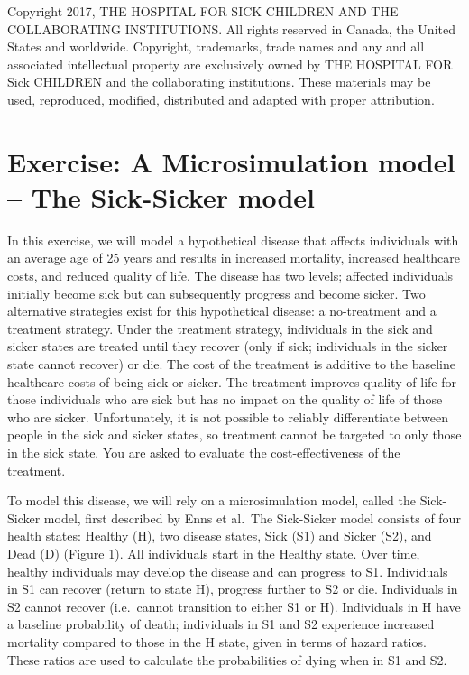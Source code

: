 \documentclass[
]{article}
\begin{document}
Copyright 2017, THE HOSPITAL FOR SICK CHILDREN AND THE COLLABORATING
INSTITUTIONS. All rights reserved in Canada, the United States and
worldwide. Copyright, trademarks, trade names and any and all associated
intellectual property are exclusively owned by THE HOSPITAL FOR Sick
CHILDREN and the collaborating institutions. These materials may be
used, reproduced, modified, distributed and adapted with proper
attribution.

\hypertarget{exercise-a-microsimulation-model-the-sick-sicker-model}{%
\section{Exercise: A Microsimulation model -- The Sick-Sicker
model}\label{exercise-a-microsimulation-model-the-sick-sicker-model}}

In this exercise, we will model a hypothetical disease that affects
individuals with an average age of 25 years and results in increased
mortality, increased healthcare costs, and reduced quality of life. The
disease has two levels; affected individuals initially become sick but
can subsequently progress and become sicker. Two alternative strategies
exist for this hypothetical disease: a no-treatment and a treatment
strategy. Under the treatment strategy, individuals in the sick and
sicker states are treated until they recover (only if sick; individuals
in the sicker state cannot recover) or die. The cost of the treatment is
additive to the baseline healthcare costs of being sick or sicker. The
treatment improves quality of life for those individuals who are sick
but has no impact on the quality of life of those who are sicker.
Unfortunately, it is not possible to reliably differentiate between
people in the sick and sicker states, so treatment cannot be targeted to
only those in the sick state. You are asked to evaluate the
cost-effectiveness of the treatment.

To model this disease, we will rely on a microsimulation model, called
the Sick-Sicker model, first described by Enns et al.~The Sick-Sicker
model consists of four health states: Healthy (H), two disease states,
Sick (S1) and Sicker (S2), and Dead (D) (Figure 1). All individuals
start in the Healthy state. Over time, healthy individuals may develop
the disease and can progress to S1. Individuals in S1 can recover
(return to state H), progress further to S2 or die. Individuals in S2
cannot recover (i.e.~cannot transition to either S1 or H). Individuals
in H have a baseline probability of death; individuals in S1 and S2
experience increased mortality compared to those in the H state, given
in terms of hazard ratios. These ratios are used to calculate the
probabilities of dying when in S1 and S2.
\end{document}
